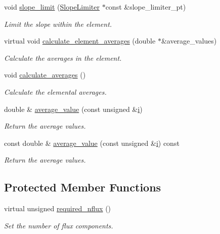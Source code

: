 \begin{DoxyCompactItemize}
\item 
void \hyperlink{classoomph_1_1DGElement_a69834c27193675dfa9e9d03413ac9d7e}{slope\+\_\+limit} (\hyperlink{classoomph_1_1SlopeLimiter}{Slope\+Limiter} $\ast$const \&slope\+\_\+limiter\+\_\+pt)
\begin{DoxyCompactList}\small\item\em Limit the slope within the element. \end{DoxyCompactList}\item 
virtual void \hyperlink{classoomph_1_1DGElement_a336c61ef405a4710060f177e707c3ec9}{calculate\+\_\+element\+\_\+averages} (double $\ast$\&average\+\_\+values)
\begin{DoxyCompactList}\small\item\em Calculate the averages in the element. \end{DoxyCompactList}\item 
void \hyperlink{classoomph_1_1DGElement_a23227ce4e1bd1c24b0d1ae203c36703a}{calculate\+\_\+averages} ()
\begin{DoxyCompactList}\small\item\em Calculate the elemental averages. \end{DoxyCompactList}\item 
double \& \hyperlink{classoomph_1_1DGElement_a9349e3c349f9cf3b25bcb6121e86a7f2}{average\+\_\+value} (const unsigned \&\hyperlink{cfortran_8h_adb50e893b86b3e55e751a42eab3cba82}{i})
\begin{DoxyCompactList}\small\item\em Return the average values. \end{DoxyCompactList}\item 
const double \& \hyperlink{classoomph_1_1DGElement_ad4cbd42c864738c6ee6b3ba388b8168c}{average\+\_\+value} (const unsigned \&\hyperlink{cfortran_8h_adb50e893b86b3e55e751a42eab3cba82}{i}) const
\begin{DoxyCompactList}\small\item\em Return the average values. \end{DoxyCompactList}\end{DoxyCompactItemize}
\subsection*{Protected Member Functions}
\begin{DoxyCompactItemize}
\item 
virtual unsigned \hyperlink{classoomph_1_1DGElement_a87dc9f5b40437c3ab22db35229012c07}{required\+\_\+nflux} ()
\begin{DoxyCompactList}\small\item\em Set the number of flux components. \end{DoxyCompactList}\end{DoxyCompactItemize}
